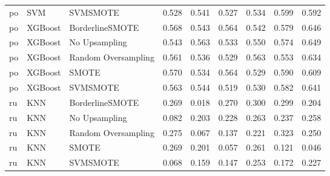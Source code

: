 \begin{tabular}{lllllllll}
      po &                          SVM &            SVMSMOTE & 0.528 &                     0.541 &                 0.527 &                  0.534 &                                   0.599 &     0.592 \\
      po &                      XGBoost &     BorderlineSMOTE & 0.568 &                     0.543 &                 0.564 &                  0.542 &                                   0.579 &     0.646 \\
      po &                      XGBoost &       No Upsampling & 0.543 &                     0.563 &                 0.533 &                  0.550 &                                   0.574 &     0.649 \\
      po &                      XGBoost & Random Oversampling & 0.561 &                     0.536 &                 0.529 &                  0.563 &                                   0.553 &     0.634 \\
      po &                      XGBoost &               SMOTE & 0.570 &                     0.534 &                 0.564 &                  0.529 &                                   0.590 &     0.609 \\
      po &                      XGBoost &            SVMSMOTE & 0.563 &                     0.544 &                 0.519 &                  0.530 &                                   0.582 &     0.641 \\
      ru &                          KNN &     BorderlineSMOTE & 0.269 &                     0.018 &                 0.270 &                  0.300 &                                   0.299 &     0.204 \\
      ru &                          KNN &       No Upsampling & 0.082 &                     0.203 &                 0.228 &                  0.263 &                                   0.237 &     0.258 \\
      ru &                          KNN & Random Oversampling & 0.275 &                     0.067 &                 0.137 &                  0.221 &                                   0.323 &     0.250 \\
      ru &                          KNN &               SMOTE & 0.269 &                     0.201 &                 0.057 &                  0.261 &                                   0.121 &     0.046 \\
      ru &                          KNN &            SVMSMOTE & 0.068 &                     0.159 &                 0.147 &                  0.253 &                                   0.172 &     0.227 \\

\end{tabular}
